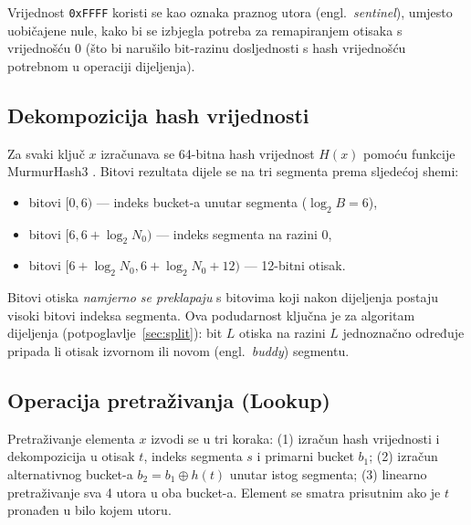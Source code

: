 \documentclass[12pt,a4paper]{article}
\begin{document}
\noindent Vrijednost \texttt{0xFFFF} koristi se kao oznaka praznog utora
(engl.~\textit{sentinel}), umjesto uobičajene nule, kako bi se izbjegla potreba za
remapiranjem otisaka s vrijednošću 0 (što bi narušilo bit-razinu dosljednosti
s hash vrijednošću potrebnom u operaciji dijeljenja).

\subsection{Dekompozicija hash vrijednosti}
\label{sec:hash}
Za svaki ključ $x$ izračunava se 64-bitna hash vrijednost $H(x)$ pomoću funkcije
MurmurHash3 \cite{appleby-murmurhash}. Bitovi rezultata dijele se na tri segmenta
prema sljedećoj shemi:
\begin{itemize}
    \item bitovi $[0, 6)$ --- indeks bucket-a unutar segmenta ($\log_2 B = 6$),
    \item bitovi $[6, 6 + \log_2 N_0)$ --- indeks segmenta na razini 0,
    \item bitovi $[6 + \log_2 N_0, 6 + \log_2 N_0 + 12)$ --- 12-bitni otisak.
\end{itemize}
Bitovi otiska \emph{namjerno se preklapaju} s bitovima koji nakon dijeljenja postaju
visoki bitovi indeksa segmenta. Ova podudarnost ključna je za algoritam dijeljenja
(potpoglavlje~\ref{sec:split}): bit $L$ otiska na razini $L$ jednoznačno određuje pripada
li otisak izvornom ili novom (engl.~\textit{buddy}) segmentu.

\subsection{Operacija pretraživanja (Lookup)}
Pretraživanje elementa $x$ izvodi se u tri koraka: (1) izračun hash vrijednosti i
dekompozicija u otisak $t$, indeks segmenta $s$ i primarni bucket $b_1$; (2) izračun
alternativnog bucket-a $b_2 = b_1 \oplus h(t)$ unutar istog segmenta; (3) linearno
pretraživanje sva 4 utora u oba bucket-a. Element se smatra prisutnim ako je $t$
pronađen u bilo kojem utoru.
\end{document}
